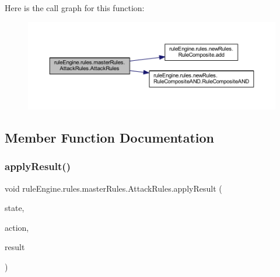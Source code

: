 Here is the call graph for this function\+:
\nopagebreak
\begin{figure}[H]
\begin{center}
\leavevmode
\includegraphics[width=350pt]{classrule_engine_1_1rules_1_1master_rules_1_1_attack_rules_abff281f832282088921c75c1c35a9310_cgraph}
\end{center}
\end{figure}


\subsection{Member Function Documentation}
\mbox{\label{classrule_engine_1_1rules_1_1master_rules_1_1_attack_rules_ae45bbf8fb4c1cef3733c6051f8b8b008}} 
\subsubsection{\texorpdfstring{apply\+Result()}{applyResult()}}
{\footnotesize\ttfamily void rule\+Engine.\+rules.\+master\+Rules.\+Attack\+Rules.\+apply\+Result (\begin{DoxyParamCaption}\item[{\mbox{\hyperlink{classgame_1_1game_state_1_1_game_state}{Game\+State}}}]{state,  }\item[{\mbox{\hyperlink{classrule_engine_1_1_game_action}{Game\+Action}}}]{action,  }\item[{\mbox{\hyperlink{classrule_engine_1_1_rule_result}{Rule\+Result}}}]{result }\end{DoxyParamCaption})\hspace{0.3cm}{\ttfamily [inline]}}

